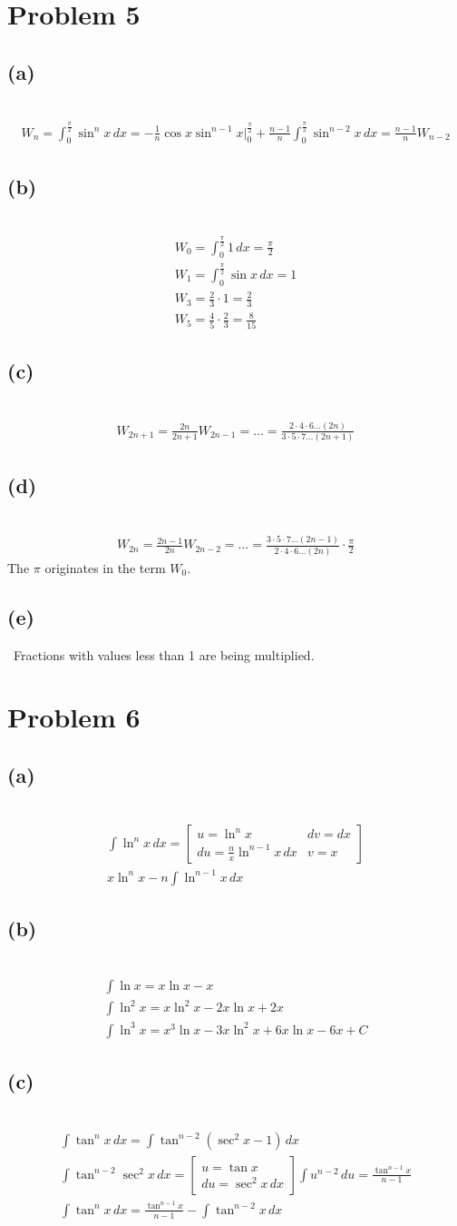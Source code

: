 \documentclass[12pt]{article}
\newcommand{\vem}{\vspace{0.5em}}
\newcommand{\problem}[1]{\section{Problem #1}}
\newcommand{\subproblem}[1]{\subsection{(#1)} \,}
\begin{document}
\problem{5}

\subproblem{a}
\begin{gather*}
    W_n = \int_0^\frac{\pi}{2}\sin^n x\, dx = -\frac{1}{n}\cos x \sin ^{n-1}x\Big|^\frac{\pi}{2}_0 + \frac{n-1}{n} \int_0^\frac{\pi}{2} \sin^{n-2}x\, dx = \frac{n-1}{n}W_{n-2}
\end{gather*}

\subproblem{b}
\begin{gather*}
    W_0=\int_0^\frac{\pi}{2} 1 \, dx=\frac{\pi}{2}\\
    W_1 = \int_0^\frac{\pi}{2} \sin x\, dx=1\\
    W_3 = \frac{2}{3}\cdot 1= \frac{2}{3}\\
    W_5 = \frac{4}{5} \cdot \frac{2}{3} =\frac{8}{15}
\end{gather*}

\subproblem{c}
\begin{gather*}
    W_{2n+1}= \frac{2n}{2n+1}W_{2n-1}=\dots = \frac{2\cdot 4 \cdot 6 \dots (2n)}{3\cdot 5\cdot 7\dots (2n+1)}
\end{gather*}

\subproblem{d}
\begin{gather*}
    W_{2n} = \frac{2n-1}{2n}W_{2n-2}=\dots = \frac{3\cdot 5\cdot 7\dots (2n-1)}{2\cdot 4\cdot 6\dots (2n)} \cdot \frac{\pi}{2}
\end{gather*}
The $\pi$ originates in the term $W_0$. \vem

\subproblem{e}
Fractions with values less than 1 are being multiplied.

\problem{6}

\subproblem{a}
\begin{gather*}
    \int \ln^n x\, dx = 
    \begin{bmatrix}
        u =\ln^n x & dv=dx\\
        du = \frac{n}{x}\ln^{n-1}x\, dx & v=x
    \end{bmatrix}\\
    \boxed{x \ln ^n x- n\int \ln^{n-1}x\, dx }
\end{gather*}

\subproblem{b}
\begin{gather*}
    \int \ln x = x\ln x -x\\
    \int \ln^2 x = x \ln^2 x -2 x\ln x + 2x\\
    \int \ln^3 x = \boxed{x^3\ln x - 3x\ln ^2 x + 6x\ln x - 6x +C}
\end{gather*}

\subproblem{c}
\begin{gather*}
    \int \tan^n x\, dx = \int \tan^{n-2} (\sec ^2 x -1)\, dx\\
    \int \tan^{n-2} \sec^2 x \, dx= \begin{bmatrix}
        u=\tan x\\
        du=\sec^2 x \, dx
    \end{bmatrix} \int u^{n-2} \, du = \frac{\tan^{n-1} x}{n-1}\\
    \int \tan^n x\, dx  =\boxed{\frac{\tan^{n-1} x}{n-1} - \int \tan^{n-2} x\, dx}
\end{gather*}
\end{document}

